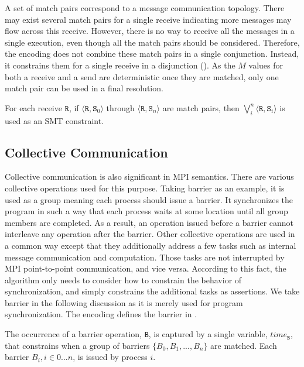 A set of match pairs correspond to a message communication topology. There may exist several match pairs for a single receive indicating more messages may flow across this receive. However, there is no way to receive all the messages in a single execution, even though all the match pairs should be considered. Therefore, the encoding does not combine these match pairs in a single conjunction. Instead, it constrains them for a single receive in a disjunction (). As the $M$ values for both a receive and a send are deterministic once they are matched, only one match pair can be used in a final resolution.

\begin{definition} \label{def:receive_match}
For each receive $\mathtt{R}$, if $\langle\mathtt{R},
\mathtt{S}_0\rangle$ through $\langle\mathtt{R}, \mathtt{S}_n\rangle$
are match pairs, then $\bigvee_{i}^{n} \langle\mathtt{R},
\mathtt{S}_i\rangle$ is used as an SMT constraint.
\end{definition}

\subsection{Collective Communication}
Collective communication is also significant in MPI semantics. There are various collective operations used for this purpose.  Taking barrier as an example, it is used as a group meaning each process should issue a barrier.  It synchronizes the program in such a way that each process waits at some location until all group members are completed. As a result, an operation issued before a barrier cannot interleave any operation after the barrier. Other collective operations are used in a common way except that they additionally address a few tasks such as internal message communication and computation. Those tasks are not interrupted by MPI point-to-point communication, and vice versa. According to this fact, the algorithm only needs to consider how to constrain the behavior of synchronization, and simply constrains the additional tasks as assertions. We take barrier in the following discussion as it is merely used for program synchronization. The encoding defines the barrier in . 

\begin{definition}[Barrier]\label{def:barrier}
The occurrence of a barrier operation, \texttt{B}, is captured by a
single variable, $\mathit{time}_\mathtt{B}$, that constrains when a group of barriers $\{B_0, B_1, ..., B_n\}$ are matched.  
Each barrier $B_i, i\in{0 ... n}$, is issued by process $i$. 
\end{definition}

